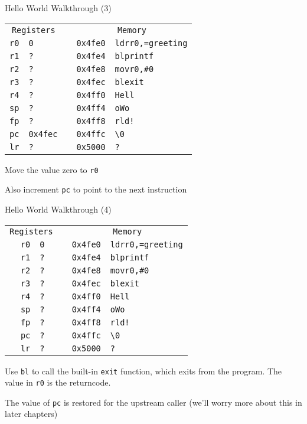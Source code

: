 \begin{frame}{Hello World Walkthrough (3)}
    \begin{alltt}
        \begin{tabular}{ r | l p{5mm} r | l }
            \multicolumn{2}{c}{Registers} && \multicolumn{2}{c}{Memory} \\
            r0 & 0 && 0x4fe0 & ldr r0, =greeting \\
            r1 & ? && 0x4fe4 & bl printf \\
            r2 & ? && 0x4fe8 & mov r0, \#0 \\
            r3 & ? && 0x4fec & bl exit \\
            r4 & ? && 0x4ff0 & Hell \\
            sp & ? && 0x4ff4 & o Wo \\
            fp & ? && 0x4ff8 & rld! \\
            pc & 0x4fec && 0x4ffc & {\textbackslash}0 \\
            lr & ? && 0x5000 & ? \\
            \end{tabular}
        \end{alltt}

        Move the value zero to \texttt{r0}

        Also increment \texttt{pc} to point to the next instruction


\end{frame}

\begin{frame}{Hello World Walkthrough (4)}
    \begin{alltt}
        \begin{tabular}{ r | l p{5mm} r | l }
            \multicolumn{2}{c}{Registers} && \multicolumn{2}{c}{Memory} \\
            r0 & 0 && 0x4fe0 & ldr r0, =greeting \\
            r1 & ? && 0x4fe4 & bl printf \\
            r2 & ? && 0x4fe8 & mov r0, \#0 \\
            r3 & ? && 0x4fec & bl exit \\
            r4 & ? && 0x4ff0 & Hell \\
            sp & ? && 0x4ff4 & o Wo \\
            fp & ? && 0x4ff8 & rld! \\
            pc & ? && 0x4ffc & {\textbackslash}0 \\
            lr & ? && 0x5000 & ? \\
        \end{tabular}
    \end{alltt}

    Use \texttt{bl} to call the built-in \texttt{exit} function, which exits from the program. The value in \texttt{r0} is the returncode.
    
    The value of \texttt{pc} is restored for the upstream caller (we'll worry more about this in later chapters)

\end{frame}
















